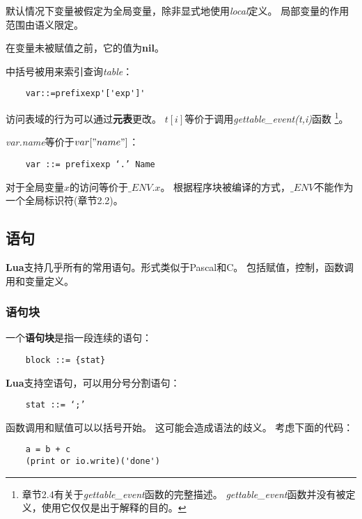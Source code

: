 \documentclass{ctexart}
\begin{document}
默认情况下变量被假定为全局变量，除非显式地使用\emph{local}定义。
局部变量的作用范围由语义限定。

在变量未被赋值之前，它的值为\textbf{nil}。

中括号被用来索引查询\emph{table}：

\lstset{language=C}
\begin{lstlisting}
	var::=prefixexp'['exp']'
\end{lstlisting}

访问表域的行为可以通过\textbf{元表}更改。
$t[i]$等价于调用\emph{gettable\_event(t,i)}函数
\footnote{章节2.4有关于\emph{gettable\_event}函数的完整描述。
\emph{gettable\_event}函数并没有被定义，使用它仅仅是出于解释的目的。}。

\emph{var.name}等价于$var["name"]$：

\lstset{language=C}
\begin{lstlisting}
	var ::= prefixexp ‘.’ Name
\end{lstlisting}

对于全局变量$x$的访问等价于$\_ENV.x$。
根据程序块被编译的方式，$\_ENV$不能作为一个全局标识符(章节2.2)。

\subsection{语句}

\textbf{Lua}支持几乎所有的常用语句。形式类似于Pascal和C。
包括赋值，控制，函数调用和变量定义。

\subsubsection{语句块}

一个\textbf{语句块}是指一段连续的语句：
\lstset{language=C}
\begin{lstlisting}
	block ::= {stat}
\end{lstlisting}

\textbf{Lua}支持空语句，可以用分号分割语句：

\lstset{language=C}
\begin{lstlisting}
	stat ::= ‘;’
\end{lstlisting}

函数调用和赋值可以以括号开始。
这可能会造成语法的歧义。
考虑下面的代码：

\lstset{language=C}
\begin{lstlisting}
	a = b + c
	(print or io.write)('done')
\end{lstlisting}
\end{document}
